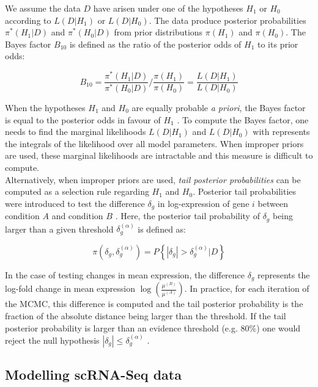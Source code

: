 We assume the data $D$ have arisen under one of the hypotheses $H_1$ or $H_0$ according to $L(D|H_1)$ or $L(D|H_0)$. The data produce posterior probabilities $\pi^*(H_1|D)$ and $\pi^*(H_0|D)$ from prior distributions $\pi(H_1)$ and $\pi(H_0)$. The Bayes factor $B_{10}$ \citep{Jeffreys1961} is defined as the ratio of the posterior odds of $H_1$ to its prior odds:

\begin{equation}
B_{10}=\frac{\pi^*(H_1|D)}{\pi^*(H_0|D)}/{}\frac{\pi(H_1)}{\pi(H_0)}=\frac{L(D|H_1)}{L(D|H_0)}
\end{equation}  

When the hypotheses $H_1$ and $H_0$ are equally probable \emph{a priori}, the Bayes factor is equal to the posterior odds in favour of $H_1$ \citep{Kass1995}. To compute the Bayes factor, one needs to find the marginal likelihoods $L(D|H_1)$ and $L(D|H_0)$ with represents the integrals of the likelihood over all model parameters. When improper priors are used, these marginal likelihoods are intractable and this measure is difficult to compute. \\

Alternatively, when improper priors are used, \emph{tail posterior probabilities} can be computed as a selection rule regarding $H_1$ and $H_0$. Posterior tail probabilities were introduced to test the difference $\delta_g$ in log-expression of gene $i$ between condition $A$ and condition $B$ \citep{Bochkina2007}. Here, the posterior tail probability of $\delta_g$ being larger than a given threshold $\delta_g^{(\alpha)}$ is defined as:

\begin{equation}
\pi(\delta_g,\delta_g^{(\alpha)})=P\left\lbrace|\delta_g|>\delta_g^{(\alpha)}|D\right\rbrace
\end{equation}

In the case of testing changes in mean expression, the difference $\delta_g$ represents the log-fold change in mean expression $\log(\frac{\mu^{(B)}}{\mu^{(A)}})$. In practice, for each iteration of the MCMC, this difference is computed and the tail posterior probability is the fraction of the absolute distance being larger than the threshold. If the tail posterior probability is larger than an evidence threshold (e.g. 80\%) one would reject the null hypothesis $|\delta_g|\leq\delta_g^{(\alpha)}$ \citep{Vallejos2016}. 

\subsection{Modelling scRNA-Seq data}

